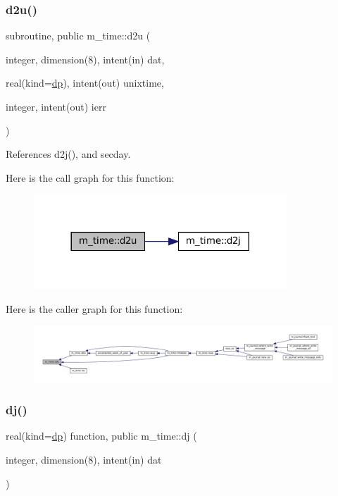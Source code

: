\subsubsection{\texorpdfstring{d2u()}{d2u()}}
{\footnotesize\ttfamily subroutine, public m\+\_\+time\+::d2u (\begin{DoxyParamCaption}\item[{integer, dimension(8), intent(in)}]{dat,  }\item[{real(kind=\mbox{\hyperlink{namespacem__time_a95f16e7435244d114f0a451625dc189a}{dp}}), intent(out)}]{unixtime,  }\item[{integer, intent(out)}]{ierr }\end{DoxyParamCaption})}



References d2j(), and secday.

Here is the call graph for this function\+:\nopagebreak
\begin{figure}[H]
\begin{center}
\leavevmode
\includegraphics[width=269pt]{namespacem__time_ac4bd98688e1277ab6cfc16697331406c_cgraph}
\end{center}
\end{figure}
Here is the caller graph for this function\+:\nopagebreak
\begin{figure}[H]
\begin{center}
\leavevmode
\includegraphics[width=350pt]{namespacem__time_ac4bd98688e1277ab6cfc16697331406c_icgraph}
\end{center}
\end{figure}
\mbox{\label{namespacem__time_ad3ce73217cd51090b52a0468b045c0f3}} 
\subsubsection{\texorpdfstring{dj()}{dj()}}
{\footnotesize\ttfamily real(kind=\mbox{\hyperlink{namespacem__time_a95f16e7435244d114f0a451625dc189a}{dp}}) function, public m\+\_\+time\+::dj (\begin{DoxyParamCaption}\item[{integer, dimension(8), intent(in)}]{dat }\end{DoxyParamCaption})}



